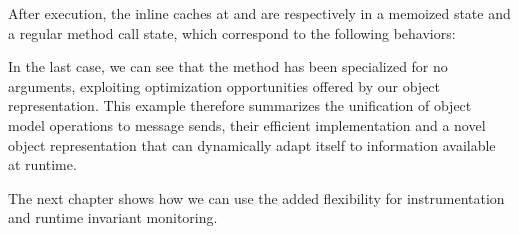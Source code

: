 After execution, the inline caches at  and  are
respectively in a memoized state and a regular method call state, which
correspond to the following behaviors: 


In the last case, we can see that the  method has been specialized for
no arguments, exploiting optimization opportunities offered by our object
representation. This example therefore summarizes the unification of object
model operations to message sends, their efficient implementation and a novel
object representation that can dynamically adapt itself to information
available at runtime.

The next chapter shows how we can use the added flexibility for instrumentation
and runtime invariant monitoring.


